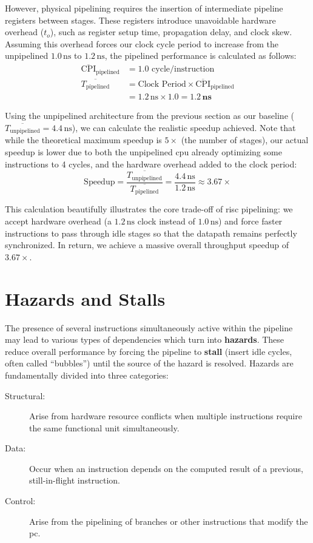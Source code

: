 However, physical pipelining requires the insertion of intermediate pipeline registers between stages. These registers introduce unavoidable hardware overhead (\(t_o\)), such as register setup time, propagation delay, and clock skew. Assuming this overhead forces our clock cycle period to increase from the unpipelined \(1.0\,\text{ns}\) to \(1.2\,\text{ns}\), the pipelined performance is calculated as follows:
\begin{align*}
    \overline{\text{CPI}}_{\text{pipelined}} &= 1.0 \text{ cycle/instruction} \\
    \overline{T_{\text{pipelined}}} &= \text{Clock Period} \times \overline{\text{CPI}}_{\text{pipelined}} \\
                                    &= 1.2\,\text{ns} \times 1.0 = \mathbf{1.2\,\text{ns}}
\end{align*}

\noindent Using the unpipelined architecture from the previous section as our baseline (\(\overline{T_{\text{unpipelined}}} = 4.4\,\text{ns}\)), we can calculate the realistic speedup achieved. Note that while the theoretical maximum speedup is \(5\times\) (the number of stages), our actual speedup is lower due to both the unpipelined \gls{cpu} already optimizing some instructions to 4 cycles, and the hardware overhead added to the clock period:
\[
    \text{Speedup} = \frac{\overline{T_{\text{unpipelined}}}}{\overline{T_{\text{pipelined}}}} = \frac{4.4\,\text{ns}}{1.2\,\text{ns}} \approx \mathbf{3.67\times}
\]

\noindent This calculation beautifully illustrates the core trade-off of \gls{risc} pipelining: we accept hardware overhead (a \(1.2\,\text{ns}\) clock instead of \(1.0\,\text{ns}\)) and force faster instructions to pass through idle stages so that the datapath remains perfectly synchronized. In return, we achieve a massive overall throughput speedup of \(3.67\times\).

\section{Hazards and Stalls}
\label{sec:hazards}
The presence of several instructions simultaneously active within the pipeline may lead to various types of dependencies which turn into \textbf{hazards}. These reduce overall performance by forcing the pipeline to \textbf{stall} (insert idle cycles, often called ``bubbles'') until the source of the hazard is resolved. Hazards are fundamentally divided into three categories:
\begin{description}
    \item[Structural:] Arise from hardware resource conflicts when multiple instructions require the same functional unit simultaneously.
    \item[Data:] Occur when an instruction depends on the computed result of a previous, still-in-flight instruction.
    \item[Control:] Arise from the pipelining of branches or other instructions that modify the \gls{pc}.
\end{description}

